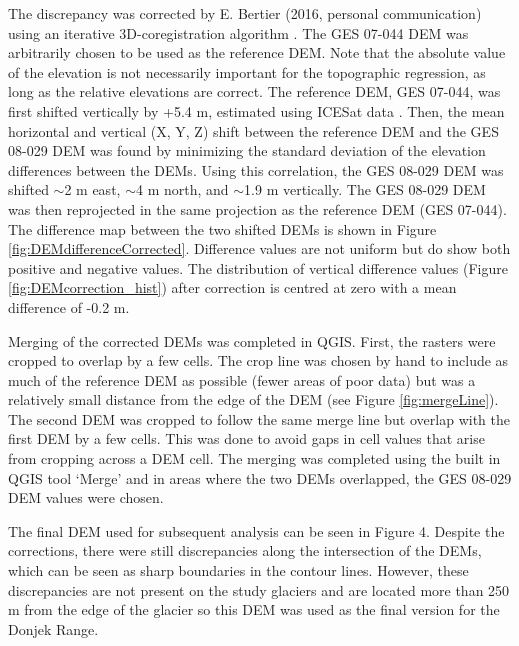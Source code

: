 \documentclass{sfuthesis}
\begin{document}
The discrepancy was corrected by E. Bertier (2016, personal communication) using an iterative 3D-coregistration algorithm \citep{Berthier2007}. The GES 07-044 DEM was arbitrarily chosen to be used as the reference DEM. Note that the absolute value of the elevation is not necessarily important for the topographic regression, as long as the relative elevations are correct. The reference DEM, GES 07-044, was first shifted vertically by +5.4 m, estimated using ICESat data \citep{Berthier2010}. Then, the mean horizontal and vertical (X, Y, Z) shift between the reference DEM and the GES 08-029 DEM was found by minimizing the standard deviation of the elevation differences between the DEMs. Using this correlation, the GES 08-029 DEM  was shifted $\sim$2 m east, $\sim$4 m north, and $\sim$1.9 m vertically. The GES 08-029 DEM was then reprojected in the same projection as the reference DEM (GES 07-044). The difference map between the two shifted DEMs is shown in Figure \ref{fig:DEMdifferenceCorrected}. Difference values are not uniform but do show both positive and negative values. The distribution of vertical difference values (Figure \ref{fig:DEMcorrection_hist}) after correction is centred at zero with a mean difference of -0.2 m.

Merging of the corrected DEMs was completed in QGIS. First, the rasters were cropped to overlap by a few cells. The crop line was chosen by hand to include as much of the reference DEM as possible (fewer areas of poor data) but was a relatively small distance from the edge of the DEM (see Figure \ref{fig:mergeLine}). The second DEM was cropped to follow the same merge line but overlap with the first DEM by a few cells. This was done to avoid gaps in cell values that arise from cropping across a DEM cell. The merging was completed using the built in QGIS tool `Merge' and in areas where the two DEMs overlapped, the GES 08-029 DEM values were chosen.

The final DEM used for subsequent analysis can be seen in Figure 4. Despite the corrections, there were still discrepancies along the intersection of the DEMs, which can be seen as sharp boundaries in the contour lines. However, these discrepancies are not present on the study glaciers and are located more than 250 m from the edge of the glacier so this DEM was used as the final version for the Donjek Range.

\begin{figure}
  \label{fig:finalDEM}
\end{figure}
\end{document}
